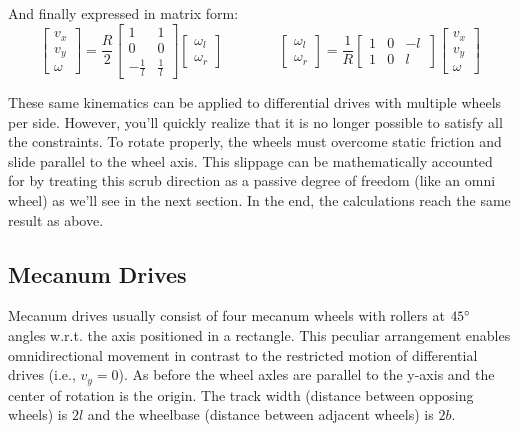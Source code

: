 \documentclass{article}
\begin{document}
And finally expressed in matrix form:
\begin{equation*}
    \begin{bmatrix}
        v_x \\
        v_y \\
        \omega
    \end{bmatrix}
    =
    \frac{R}{2}
    \begin{bmatrix}
        1 & 1 \\
        0 & 0 \\
        -\frac{1}{l} & \frac{1}{l}
    \end{bmatrix}
    \begin{bmatrix}
        \omega_l \\
        \omega_r
    \end{bmatrix}
    \qquad\qquad
    \begin{bmatrix}
        \omega_l \\
        \omega_r
    \end{bmatrix}
    =
    \frac{1}{R}
    \begin{bmatrix}
        1 & 0 & -l \, \\
        1 & 0 & l
    \end{bmatrix}
    \begin{bmatrix}
        v_x \\
        v_y \\
        \omega
    \end{bmatrix}
\end{equation*}

These same kinematics can be applied to differential drives with multiple wheels per side. However, you'll quickly realize that it is no longer possible to satisfy all the constraints. To rotate properly, the wheels must overcome static friction and slide parallel to the wheel axis. This slippage can be mathematically accounted for by treating this scrub direction as a passive degree of freedom (like an omni wheel) as we'll see in the next section. In the end, the calculations reach the same result as above.

\subsection{Mecanum Drives}

Mecanum drives usually consist of four mecanum wheels with rollers at $45\degree$ angles w.r.t. the axis positioned in a rectangle. This peculiar arrangement enables omnidirectional movement in contrast to the restricted motion of differential drives (i.e., $v_y = 0$). As before the wheel axles are parallel to the y-axis and the center of rotation is the origin. The track width (distance between opposing wheels) is $2l$ and the wheelbase (distance between adjacent wheels) is $2b$.\\
\end{document}
